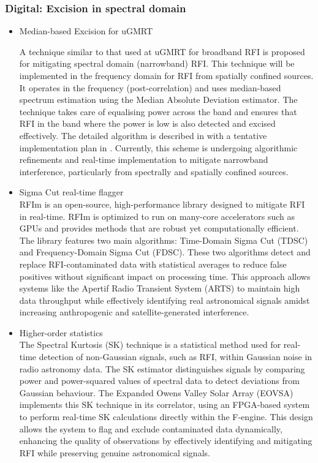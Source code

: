 \subsubsection{Digital: Excision in spectral domain}
\begin{itemize}

\item Median-based Excision for uGMRT

A technique similar to that used at uGMRT for broadband RFI is proposed for mitigating spectral domain (narrowband) RFI. This technique will be implemented in the frequency domain for RFI from spatially confined sources. It operates in the frequency (post-correlation) and uses median-based spectrum estimation using the Median Absolute Deviation estimator. The technique takes care of equalising power across the band and ensures that RFI in the band where the power is low is also detected and excised effectively. The detailed algorithm is described in \cite{buch2016towards} with a tentative implementation plan in \cite{buch2016real}. Currently, this scheme is undergoing algorithmic refinements and real-time implementation to mitigate narrowband interference, particularly from  spectrally and spatially confined sources.


\item Sigma Cut real-time flagger\\

RFIm \citep{sclocco2019real} is an open-source, high-performance library designed to mitigate RFI in real-time. RFIm is optimized to run on many-core accelerators such as GPUs and provides methods that are robust yet computationally efficient. The library features two main algorithms: Time-Domain Sigma Cut (TDSC) and Frequency-Domain Sigma Cut (FDSC). These two algorithms detect and replace RFI-contaminated data with statistical averages to reduce false positives without significant impact on processing time. This approach allows systems like the Apertif Radio Transient System (ARTS) to maintain high data throughput while effectively identifying real astronomical signals amidst increasing anthropogenic and satellite-generated interference.
 
\item Higher-order statistics\\

The Spectral Kurtosis (SK) \citep{nita2010statistics} technique is a statistical method used for real-time detection of non-Gaussian signals, such as RFI, within Gaussian noise in radio astronomy data. The SK estimator distinguishes signals by comparing power and power-squared values of spectral data to detect deviations from Gaussian behaviour. The Expanded Owens Valley Solar Array (EOVSA) implements this SK technique in its correlator, using an FPGA-based system to perform real-time SK calculations directly within the F-engine. This design allows the system to flag and exclude contaminated data dynamically, enhancing the quality of observations by effectively identifying and mitigating RFI while preserving genuine astronomical signals.


\end{itemize}
